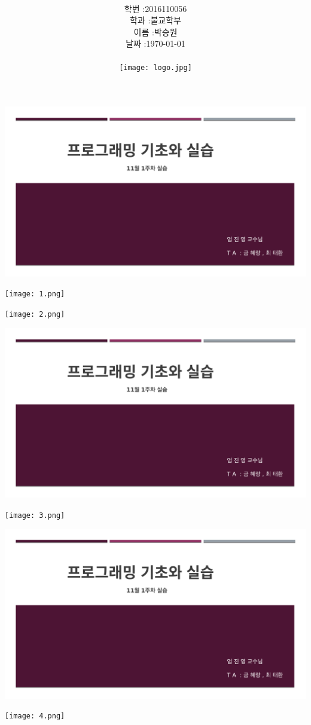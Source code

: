 \documentclass[11pt,a4paper]{article}
\title{
	\centering
	\pgfornament[width=12cm,color=teal]{84}\\
	\vspace{1cm}
	\fontsize{50}{50} \selectfont {기초 프로그래밍 실습\\11월 1주차}\\
		\pgfornament[width=12cm,color=teal]{88}\\
	\vfill}
\author{
	\LARGE
	\begin{tabular}{rl}
		\hline
		학번 : & 2016110056\\ 
		학과 : & 불교학부 \\
		이름 : & 박승원\\
		날짜 : & \today\\
		\hline
	\end{tabular}\vspace{2cm}
	\\
\texttt{[image: logo.jpg]}
	}
\date{}
\begin{document}
\maketitle
{}
\noindent
\lstset{language=C++, columns=flexible, tabsize=4, frame=shadowbox, showstringspaces=false, breaklines=true, upquote=true, basicstyle=\normalsize}
\begin{enumerate}
\includegraphics[page=3, width=\textwidth]{1.pdf}
	
\texttt{[image: 1.png]}	

	
\texttt{[image: 2.png]}	


\includegraphics[page=4, width=\textwidth]{1.pdf}
	
\texttt{[image: 3.png]}	

\includegraphics[page=5, width=\textwidth]{1.pdf}
	
\texttt{[image: 4.png]}	



\end{enumerate}
\end{document}
